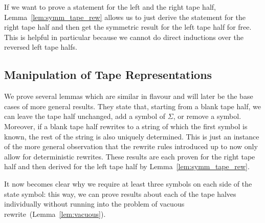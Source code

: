 If we want to prove a statement for the left and the right tape half, Lemma~\ref{lem:symm_tape_rew} allows us to just derive the statement for the right tape half and then get the symmetric result for the left tape half for free. This is helpful in particular because we cannot do direct inductions over the reversed left tape halfs. 

\subsection{Manipulation of Tape Representations}

We prove several lemmas which are similar in flavour and will later be the base cases of more general results. They state that, starting from a blank tape half, we can leave the tape half unchanged, add a symbol of $\Sigma$, or remove a symbol. Moreover, if a blank tape half rewrites to a string of which the first symbol is known, the rest of the string is also uniquely determined. This is just an instance of the more general observation that the rewrite rules introduced up to now only allow for deterministic rewrites.
These results are each proven for the right tape half and then derived for the left tape half by Lemma~\ref{lem:symm_tape_rew}. 

\begin{remark}
  It now becomes clear why we require at least three symbols on each side of the state symbol: this way, we can prove results about each of the tape halves individually without running into the problem of vacuous rewrite~(Lemma~\ref{lem:vacuous}). 
\end{remark}

